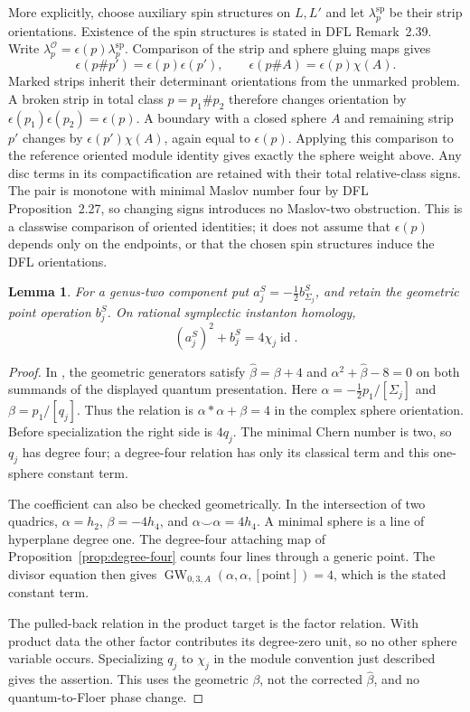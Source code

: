\documentclass[11pt]{amsart}
\newtheorem{lemma}[theorem]{Lemma}
\theoremstyle{definition}
\theoremstyle{remark}
\theoremstyle{plain}
\newcommand{\id}{\operatorname{id}}
\begin{document}
More explicitly, choose auxiliary spin structures on
$L,L'$ and let $\lambda_p^{\mathrm{sp}}$ be their
strip orientations. Existence of the spin structures
is stated in DFL Remark~2.39. Write
$\lambda_p^{\mathcal O}=\epsilon(p)\lambda_p^{\mathrm{sp}}$.
Comparison of the strip and sphere gluing maps gives
\[
 \epsilon(p\#p')=\epsilon(p)\epsilon(p'),\qquad
 \epsilon(p\#A)=\epsilon(p)\chi(A).
\]
Marked strips inherit their determinant orientations
from the unmarked problem. A broken strip in total
class $p=p_1\#p_2$ therefore changes orientation by
$\epsilon(p_1)\epsilon(p_2)=\epsilon(p)$.
A boundary with a closed sphere $A$ and remaining
strip $p'$ changes by $\epsilon(p')\chi(A)$,
again equal to $\epsilon(p)$.
Applying this comparison to the reference oriented
module identity gives exactly the sphere weight
above. Any disc terms in its compactification are
retained with their total relative-class signs.
The pair is monotone with minimal Maslov number
four by DFL Proposition~2.27, so changing signs
introduces no Maslov-two obstruction.
This is a classwise comparison of oriented identities;
it does not assume that $\epsilon(p)$ depends only
on the endpoints, or that the chosen spin structures
induce the DFL orientations.

\begin{lemma}\label{lem:signed-genus-two-quantum-relation}
For a genus-two component put
$a_j^S=-\frac12 b_{\Sigma_j}^S$, and retain
the geometric point operation $b_j^S$.
On rational symplectic instanton homology,
\[
                    (a_j^S)^2+b_j^S=4\chi_j\id.
\]
\end{lemma}

\begin{proof}
In \cite[Example~24]{Munoz99b}, the geometric
generators satisfy $\widehat\beta=\beta+4$ and
$\alpha^2+\widehat\beta-8=0$ on both summands
of the displayed quantum presentation.
Here $\alpha=-\frac12p_1/[\Sigma_j]$ and
$\beta=p_1/[q_j]$. Thus the relation is
$\alpha*\alpha+\beta=4$ in the complex sphere
orientation. Before specialization the right
side is $4q_j$. The minimal Chern number is
two, so $q_j$ has degree four; a degree-four
relation has only its classical term and
this one-sphere constant term.

The coefficient can also be checked geometrically.
In the intersection of two quadrics,
$\alpha=h_2$, $\beta=-4h_4$, and
$\alpha\smile\alpha=4h_4$.
A minimal sphere is a line of hyperplane degree one.
The degree-four attaching map of
Proposition~\ref{prop:degree-four} counts four lines
through a generic point. The divisor equation
then gives
$\operatorname{GW}_{0,3,A}(\alpha,\alpha,[\mathrm{point}])=4$,
which is the stated constant term.

The pulled-back relation in the product
target is the factor relation. With product
data the other factor contributes its
degree-zero unit, so no other sphere variable
occurs. Specializing $q_j$ to $\chi_j$ in
the module convention just described gives
the assertion. This uses the geometric
$\beta$, not the corrected
$\widehat\beta$, and no quantum-to-Floer
phase change.
\end{proof}
\end{document}
